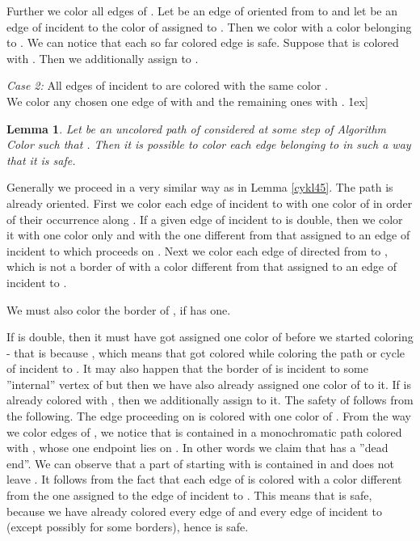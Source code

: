 \documentclass[a4, 11pt]{article}
\newcommand{\dowod}{\noindent{\bf Proof.~}}
\newcommand{\koniec}{\hfill \.1ex]}
\newcommand{\<}{\langle}
\renewcommand{\>}{\rangle}
\newtheorem{lemma}{Lemma}
\begin{document}
Further we color all edges of . Let  be an edge of  oriented from  to  and let  be an edge of  incident to 
 the color of  assigned to . Then we color  with a color  belonging to . We can notice that each so far colored edge is safe. Suppose that  is colored with . Then we additionally assign  to . 


{\em Case 2:} All edges of  incident to  are colored with the same color . \\
We color any chosen one edge of  with  and the remaining ones with .  \koniec


\begin{lemma}\label{path45}
Let  be an  uncolored path  of  considered at some step of Algorithm Color  such that . Then it is possible to color each edge belonging to  in such a way that it is safe.
\end{lemma}

\dowod 
Generally  we proceed in a very similar way as in Lemma \ref{cykl45}. The path  is already oriented.  First we color each edge  of  incident to  with one color of  in order of their occurrence along . If a given edge  of  incident to  is double, then  we color it with one color only and with the one different from that assigned to an edge of  incident to  which proceeds  on . Next we color each edge  of  directed from  to , which is not a border of  with a color different from that assigned to an edge  of  incident to . 

We must also color the border  of , if  has one. 

If  is double, then it must have got assigned one color of  before we started coloring  - that is because , which means that  got colored while coloring the path or cycle of  incident to . It may also happen that the border  of  is incident to some ''internal'' vertex of  but then we have also already assigned one color of  to it. If  is already colored with ,  then we additionally assign  to it. 
The safety of  follows from the following. The edge  proceeding  on  is colored with one color  of . From the way we color edges of , we notice that  is contained in a monochromatic path  colored with , whose one endpoint lies on . In other words we claim that  has a ''dead end''. We can observe  that a part of  starting with  is contained in  and does not leave . It follows from the fact that  each edge  of  is colored with a color different from the one assigned to the edge of  incident to . This means that  is safe, because we have already colored every edge of  and every edge of  incident to  (except possibly for some borders), hence  is safe.
\end{document}

